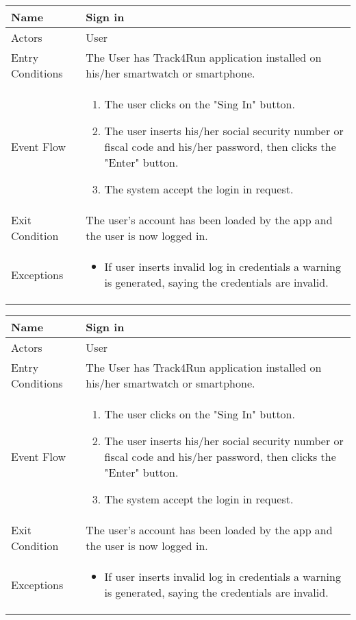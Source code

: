 \begin{table}[h]
\begin{tabular}{|l|l|}
\hline
Name             & Sign in \\ \hline
Actors           & User  \\ \hline
Entry Conditions & The User has Track4Run application installed on his/her smartwatch or smartphone.    \\ \hline
Event Flow       & \parbox{.45\textwidth}{\begin{enumerate}
            \item The user clicks on the "Sing In" button.
            \item The user inserts his/her social security number or fiscal code and his/her password, then clicks the "Enter" button.
            \item The system accept the login in request.
        \end{enumerate}}\\ \hline
Exit Condition   & The user's account has been loaded by the app and the user is now logged in.\\ \hline
Exceptions       & \parbox{.45\textwidth}  
{\begin{itemize}
\item If user inserts invalid log in credentials a warning is generated, saying the credentials are invalid.
\end{itemize}}\\ \hline
\end{tabular}
\end{table}

\begin{table}[h]
\begin{tabular}{|l|l|}
\hline
Name             & Sign in \\ \hline
Actors           & User  \\ \hline
Entry Conditions & The User has Track4Run application installed on his/her smartwatch or smartphone.    \\ \hline
Event Flow       & \parbox{.45\textwidth}{\begin{enumerate}
            \item The user clicks on the "Sing In" button.
            \item The user inserts his/her social security number or fiscal code and his/her password, then clicks the "Enter" button.
            \item The system accept the login in request.
        \end{enumerate}}\\ \hline
Exit Condition   & The user's account has been loaded by the app and the user is now logged in.\\ \hline
Exceptions       & \parbox{.45\textwidth}  
{\begin{itemize}
\item If user inserts invalid log in credentials a warning is generated, saying the credentials are invalid.
\end{itemize}}\\ \hline
\end{tabular}
\end{table}

